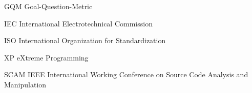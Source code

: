 \begin{siglas}
\item [GQM]  Goal-Question-Metric
\item [IEC]  International Electrotechnical Commission
\item [ISO]  International Organization for Standardization
\item[XP]     eXtreme Programming
\item[SCAM]  IEEE International Working Conference on Source Code Analysis and Manipulation

  
\end{siglas}
